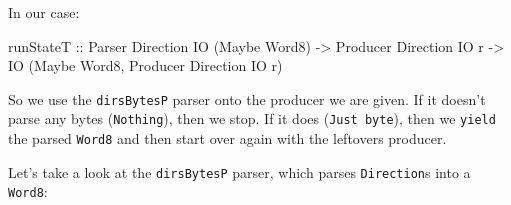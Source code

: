 \documentclass[]{article}
\newenvironment{Shaded}{\begin{snugshade}}{\end{snugshade}}
\newcommand{\CommentTok}[1]{\textcolor[rgb]{0.56,0.35,0.01}{\textit{#1}}}
\newcommand{\DataTypeTok}[1]{\textcolor[rgb]{0.13,0.29,0.53}{#1}}
\newcommand{\DecValTok}[1]{\textcolor[rgb]{0.00,0.00,0.81}{#1}}
\newcommand{\FunctionTok}[1]{\textcolor[rgb]{0.00,0.00,0.00}{#1}}
\newcommand{\KeywordTok}[1]{\textcolor[rgb]{0.13,0.29,0.53}{\textbf{#1}}}
\newcommand{\NormalTok}[1]{#1}
\newcommand{\OtherTok}[1]{\textcolor[rgb]{0.56,0.35,0.01}{#1}}
\begin{document}
In our case:

\begin{Shaded}
\begin{Highlighting}[]
\OtherTok{runStateT ::} \DataTypeTok{Parser}   \DataTypeTok{Direction} \DataTypeTok{IO}\NormalTok{ (}\DataTypeTok{Maybe} \DataTypeTok{Word8}\NormalTok{)}
          \OtherTok{->} \DataTypeTok{Producer} \DataTypeTok{Direction} \DataTypeTok{IO}\NormalTok{ r}
          \OtherTok{->} \DataTypeTok{IO}\NormalTok{ (}\DataTypeTok{Maybe} \DataTypeTok{Word8}\NormalTok{, }\DataTypeTok{Producer} \DataTypeTok{Direction} \DataTypeTok{IO}\NormalTok{ r)}
\end{Highlighting}
\end{Shaded}

So we use the \texttt{dirsBytesP} parser onto the producer we are given. If it
doesn't parse any bytes (\texttt{Nothing}), then we stop. If it does
(\texttt{Just\ byte}), then we \texttt{yield} the parsed \texttt{Word8} and then
start over again with the leftovers producer.

Let's take a look at the \texttt{dirsBytesP} parser, which parses
\texttt{Direction}s into a \texttt{Word8}:

\begin{Shaded}
\end{Shaded}
\end{document}
